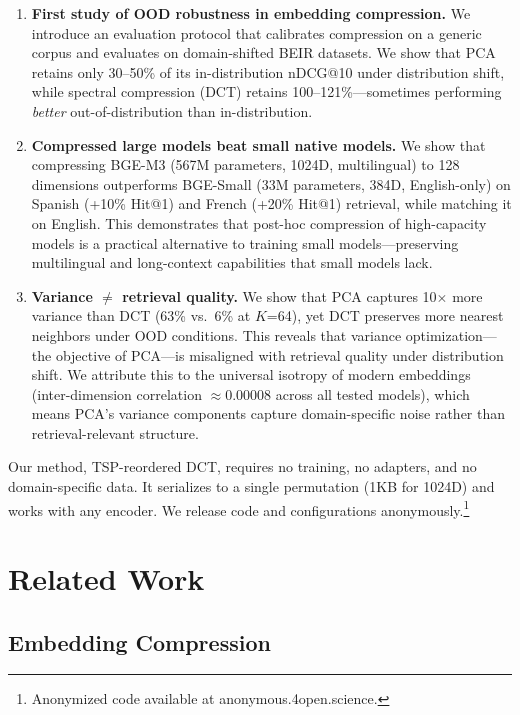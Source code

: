 \documentclass[sigconf]{acmart}
\begin{document}
\begin{enumerate}
    \item \textbf{First study of OOD robustness in embedding compression.} We introduce an evaluation protocol that calibrates compression on a generic corpus and evaluates on domain-shifted BEIR datasets. We show that PCA retains only 30--50\% of its in-distribution nDCG@10 under distribution shift, while spectral compression (DCT) retains 100--121\%---sometimes performing \emph{better} out-of-distribution than in-distribution.

    \item \textbf{Compressed large models beat small native models.} We show that compressing BGE-M3 (567M parameters, 1024D, multilingual) to 128 dimensions outperforms BGE-Small (33M parameters, 384D, English-only) on Spanish (+10\% Hit@1) and French (+20\% Hit@1) retrieval, while matching it on English. This demonstrates that post-hoc compression of high-capacity models is a practical alternative to training small models---preserving multilingual and long-context capabilities that small models lack.

    \item \textbf{Variance $\neq$ retrieval quality.} We show that PCA captures 10$\times$ more variance than DCT (63\% vs.\ 6\% at $K$=64), yet DCT preserves more nearest neighbors under OOD conditions. This reveals that variance optimization---the objective of PCA---is misaligned with retrieval quality under distribution shift. We attribute this to the universal isotropy of modern embeddings (inter-dimension correlation $\approx 0.00008$ across all tested models), which means PCA's variance components capture domain-specific noise rather than retrieval-relevant structure.
\end{enumerate}

Our method, TSP-reordered DCT, requires no training, no adapters, and no domain-specific data. It serializes to a single permutation (1KB for 1024D) and works with any encoder. We release code and configurations anonymously.\footnote{Anonymized code available at anonymous.4open.science.}

\section{Related Work}\label{sec:related}

\subsection{Embedding Compression}
\end{document}
